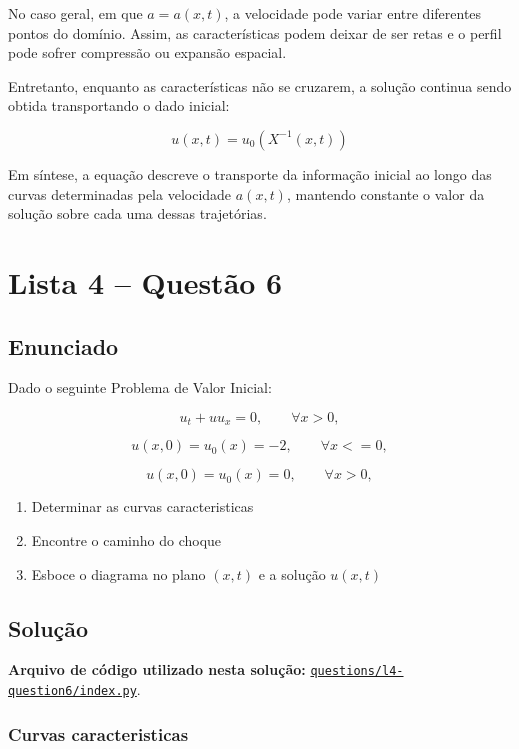 \documentclass[
    12pt,
    oneside,
    a4paper,
    english,
    brazilian,
    chapter=TITLE,
    sumario=tradicional
]{abntex2}
\newcommand{\linkcodigo}[2]{%
    \par\noindent\textbf{Arquivo de código utilizado nesta solução: }
    \href{#1}{\nolinkurl{#2}}.\par
}
\begin{document}
No caso geral, em que $a=a(x,t)$, a velocidade pode variar entre diferentes
pontos do domínio. Assim, as características podem deixar de ser retas e o
perfil pode sofrer compressão ou expansão espacial.

Entretanto, enquanto as características não se cruzarem, a solução continua
sendo obtida transportando o dado inicial:

\[
    \boxed{
        u(x,t)=u_0\left(X^{-1}(x,t)\right)
    }
\]

Em síntese, a equação descreve o transporte da informação inicial ao longo das
curvas determinadas pela velocidade $a(x,t)$, mantendo constante o valor da
solução sobre cada uma dessas trajetórias.
\fi

\newpage

\chapter{Lista 4 -- Questão 6}

\section{Enunciado}

Dado o seguinte Problema de Valor Inicial:

\[
    u_t + uu_x = 0, \qquad \forall x>0,
\]

\[
    u(x,0)=u_0(x) = -2,
    \qquad \forall x<=0,
\]

\[
    u(x,0)=u_0(x) = 0,
    \qquad \forall x>0,
\]

\begin{enumerate}
    \item Determinar as curvas caracteristicas
    \item Encontre o caminho do choque
    \item Esboce o diagrama no plano $(x, t)$ e a solução $u(x, t)$
\end{enumerate}

\section{Solução}

\linkcodigo
{https://github.com/kauanpecanha/Faculdade/blob/master/MEDO2/trabalho1/questions/l4-question6/index.py}
{questions/l4-question6/index.py}

\subsection{Curvas caracteristicas}
\end{document}
